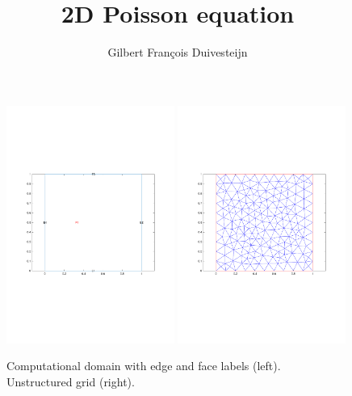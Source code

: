 \documentclass[11pt, a4paper]{article}
\title{2D Poisson equation}
\author{Gilbert Fran\c cois Duivesteijn}
\begin{document}
\maketitle

\begin{figure}
  \includegraphics[width=0.49\textwidth]{assets/domain.pdf}
  \includegraphics[width=0.49\textwidth]{assets/mesh.pdf}
  \caption{Computational domain with edge and face labels (left). Unstructured grid (right).}\label{fig:domain}
\end{figure}
\end{document}
